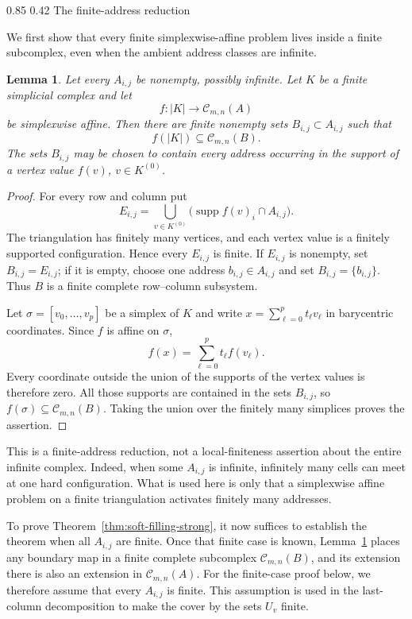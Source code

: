 \documentclass[11pt,reqno]{amsart}
\makeatletter
\numberwithin{equation}{section}
\renewcommand\subsection{\@startsection{subsection}{2}{\z@}%
  {0.85\baselineskip \@plus 0.25\baselineskip \@minus 0.10\baselineskip}%
  {0.42\baselineskip}%
  {\normalfont\bfseries}}
\newtheorem{lemma}[theorem]{Lemma}
\theoremstyle{definition}
\theoremstyle{remark}
\newcommand{\supp}{\operatorname{supp}}
\makeatother
\begin{document}
\subsection{The finite-address reduction}

We first show that every finite simplexwise-affine problem lives inside a finite
subcomplex, even when the ambient address classes are infinite.

\begin{lemma}\label{lem:finite-address-reduction}
Let every $A_{i,j}$ be nonempty, possibly infinite.  Let $K$ be a finite
simplicial complex and let
\[
 f:|K|\longrightarrow\mathcal C_{m,n}(A)
\]
be simplexwise affine.  Then there are finite nonempty sets
$B_{i,j}\subset A_{i,j}$ such that
\[
 f(|K|)\subseteq\mathcal C_{m,n}(B).
\]
The sets $B_{i,j}$ may be chosen to contain every address occurring in the
support of a vertex value $f(v)$, $v\in K^{(0)}$.
\end{lemma}

\begin{proof}
For every row and column put
\[
 E_{i,j}
 =\bigcup_{v\in K^{(0)}}
   \bigl(\supp f(v)_i\cap A_{i,j}\bigr).
\]
The triangulation has finitely many vertices, and each vertex value is a
finitely supported configuration.  Hence every $E_{i,j}$ is finite.  If
$E_{i,j}$ is nonempty, set $B_{i,j}=E_{i,j}$; if it is empty, choose one
address $b_{i,j}\in A_{i,j}$ and set $B_{i,j}=\{b_{i,j}\}$.  Thus $B$ is a
finite complete row--column subsystem.

Let $\sigma=[v_0,\ldots,v_p]$ be a simplex of $K$ and write
$x=\sum_{\ell=0}^p t_\ell v_\ell$ in barycentric coordinates.  Since $f$ is
affine on $\sigma$,
\[
 f(x)=\sum_{\ell=0}^p t_\ell f(v_\ell).
\]
Every coordinate outside the union of the supports of the vertex values is
therefore zero.  All those supports are contained in the sets $B_{i,j}$, so
$f(\sigma)\subseteq\mathcal C_{m,n}(B)$.  Taking the union over the finitely
many simplices proves the assertion.
\end{proof}

This is a finite-address reduction, not a local-finiteness assertion about
the entire infinite complex.  Indeed, when some $A_{i,j}$ is infinite,
infinitely many cells can meet at one hard configuration.  What is used here
is only that a simplexwise affine problem on a finite triangulation activates
finitely many addresses.

To prove Theorem~\ref{thm:soft-filling-strong}, it now suffices to establish
the theorem when all $A_{i,j}$ are finite.  Once that finite case is known,
Lemma~\ref{lem:finite-address-reduction} places any boundary map in a finite
complete subcomplex $\mathcal C_{m,n}(B)$, and its extension there is also an
extension in $\mathcal C_{m,n}(A)$.  For the finite-case proof below, we
therefore assume that every $A_{i,j}$ is finite.  This assumption is used in
the last-column decomposition to make the cover by the sets $U_v$ finite.
\end{document}
